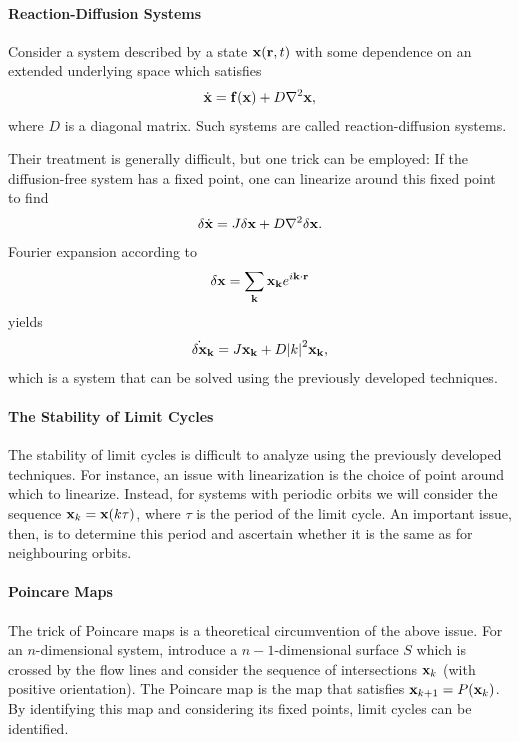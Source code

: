 \paragraph{Reaction-Diffusion Systems}
Consider a system described by a state $\vb{x}(\vb{r}, t)$ with some dependence on an extended underlying space which satisfies
\begin{align*}
	\dot{\vb{x}} = \vb{f}(\vb{x}) + D\laplacian{\vb{x}},
\end{align*}
where $D$ is a diagonal matrix. Such systems are called reaction-diffusion systems.

Their treatment is generally difficult, but one trick can be employed: If the diffusion-free system has a fixed point, one can linearize around this fixed point to find
\begin{align*}
	\delta\dot{\vb{x}} = J\delta\vb{x} + D\laplacian{\delta\vb{x}}.
\end{align*}
Fourier expansion according to
\begin{align*}
	\delta\vb{x} = \sum\limits_{\vb{k}}\vb{x}_{\vb{k}}e^{i\vb{k}\cdot\vb{r}}
\end{align*}
yields
\begin{align*}
	\dot{\delta\vb{x}}_{\vb{k}} = J\vb{x}_{\vb{k}} + D\abs{k}^{2}\vb{x}_{\vb{k}},
\end{align*}
which is a system that can be solved using the previously developed techniques.

\paragraph{The Stability of Limit Cycles}
The stability of limit cycles is difficult to analyze using the previously developed techniques. For instance, an issue with linearization is the choice of point around which to linearize. Instead, for systems with periodic orbits we will consider the sequence $\vb{x}_{k} = \vb{x}(k\tau)$, where $\tau$ is the period of the limit cycle. An important issue, then, is to determine this period and ascertain whether it is the same as for neighbouring orbits.

\paragraph{Poincare Maps}
The trick of Poincare maps is a theoretical circumvention of the above issue. For an $n$-dimensional system, introduce a $n - 1$-dimensional surface $S$ which is crossed by the flow lines and consider the sequence of intersections $\vb{x}_{k}$ (with positive orientation). The Poincare map is the map that satisfies $\vb{x}_{k + 1} = P(\vb{x}_{k})$. By identifying this map and considering its fixed points, limit cycles can be identified.

